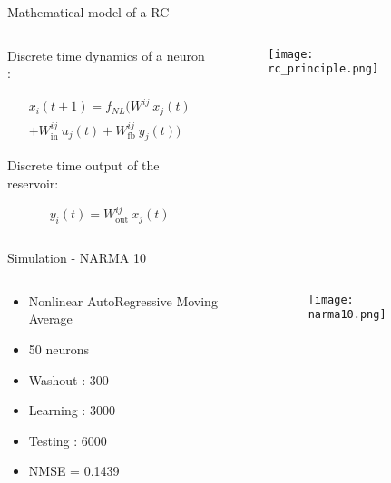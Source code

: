 \begin{frame}{Mathematical model of a RC}
	\begin{columns}[T] %
	\begin{column}{.48\textwidth}
	
		Discrete time dynamics of a neuron \cite{JaegerH.2001Tesa}:
		
		\begin{multline}
			x_i (t+1) = f_{NL} \biggl( W^{ij}~x_j(t)\\ + W^{ij}_{\text{in}}~u_j(t)+W^{ij}_{\text{fb}}~y_j(t) \biggl)
		\end{multline}
		
		Discrete time output of the reservoir:
		
		\begin{equation}
			y_i(t) = W^{ij}_{\text{out}} ~x_j(t)
		\end{equation}
	
	\end{column}%
	\hfill%
	\begin{column}{.48\textwidth}
	
	\begin{figure}
		\texttt{[image: rc\_principle.png]}
		\caption{\cite{financialTimeSeries}}
	\end{figure}
	
	\end{column}%
	\end{columns}
\end{frame}

\begin{frame}{Simulation - NARMA 10}
	\begin{columns} %
	\begin{column}{.33\textwidth}
	
		\begin{itemize}
			\item Nonlinear AutoRegressive Moving Average
			\item 50 neurons
			\item Washout : 300
			\item Learning : 3000
			\item Testing : 6000
			\item NMSE = 0.1439
		\end{itemize}
		
	\end{column}%
	\hfill%
	\begin{column}{.63\textwidth}
		\begin{figure}
		\texttt{[image: narma10.png]}
	\end{figure}
	
	\end{column}%
	\end{columns}



\end{frame}

